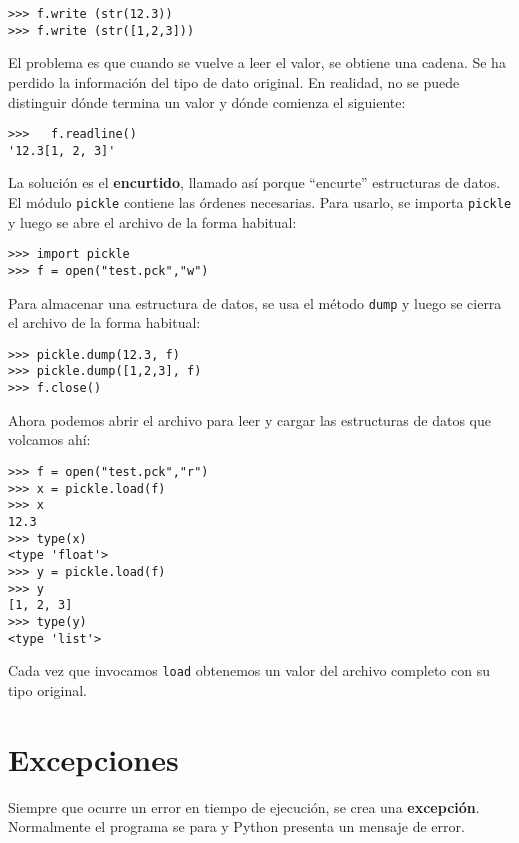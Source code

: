 \beforeverb
\begin{verbatim}
>>> f.write (str(12.3))
>>> f.write (str([1,2,3]))
\end{verbatim}
\afterverb
%
El problema es que cuando se vuelve a leer el valor, se obtiene una cadena.
Se ha perdido la información del tipo de dato original. En realidad, no
se puede distinguir dónde termina un valor y dónde comienza el siguiente:

\beforeverb
\begin{verbatim}
>>>   f.readline()
'12.3[1, 2, 3]'
\end{verbatim}
\afterverb
%
La solución es el {\bf encurtido}, llamado así porque ``encurte''
estructuras de datos. El módulo \texttt{pickle} contiene las órdenes
necesarias. Para usarlo, se importa \texttt{pickle} y luego se abre 
el archivo de la forma habitual:

\beforeverb
\begin{verbatim}
>>> import pickle
>>> f = open("test.pck","w")
\end{verbatim}
\afterverb
%
Para almacenar una estructura de datos, se usa el método \texttt{dump}
y luego se cierra el archivo de la forma habitual:

\beforeverb
\begin{verbatim}
>>> pickle.dump(12.3, f)
>>> pickle.dump([1,2,3], f)
>>> f.close()
\end{verbatim}
\afterverb
%
Ahora podemos abrir el archivo para leer y cargar las estructuras
de datos que volcamos ahí:

\beforeverb
\begin{verbatim}
>>> f = open("test.pck","r")
>>> x = pickle.load(f)
>>> x
12.3
>>> type(x)
<type 'float'>
>>> y = pickle.load(f)
>>> y
[1, 2, 3]
>>> type(y)
<type 'list'>
\end{verbatim}
\afterverb
%
Cada vez que invocamos \texttt{load} obtenemos un valor del archivo
completo con su tipo original.


\section{Excepciones}

Siempre que ocurre un error en tiempo de ejecución, se crea una
{\bf excepción}. Normalmente el programa se para y Python
presenta un mensaje de error.

